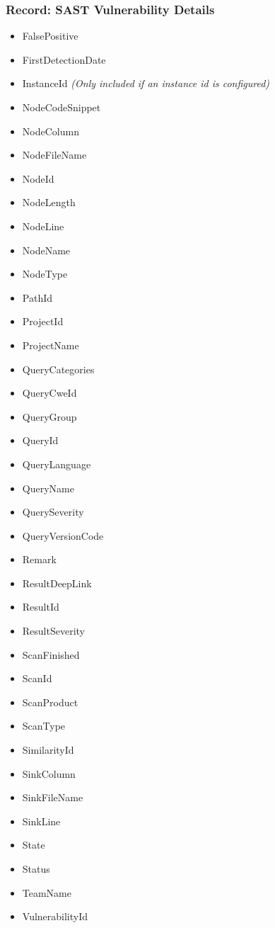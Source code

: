 \subsubsection{Record: SAST Vulnerability Details}

\begin{itemize}
    \item FalsePositive
    \item FirstDetectionDate
    \item InstanceId \textit{(Only included if an instance id is configured)}
    \item NodeCodeSnippet
    \item NodeColumn
    \item NodeFileName
    \item NodeId
    \item NodeLength
    \item NodeLine
    \item NodeName
    \item NodeType
    \item PathId
    \item ProjectId
    \item ProjectName
    \item QueryCategories
    \item QueryCweId
    \item QueryGroup
    \item QueryId
    \item QueryLanguage
    \item QueryName
    \item QuerySeverity
    \item QueryVersionCode
    \item Remark
    \item ResultDeepLink
    \item ResultId
    \item ResultSeverity
    \item ScanFinished
    \item ScanId
    \item ScanProduct
    \item ScanType
    \item SimilarityId
    \item SinkColumn
    \item SinkFileName
    \item SinkLine
    \item State
    \item Status
    \item TeamName
    \item VulnerabilityId
\end{itemize}

